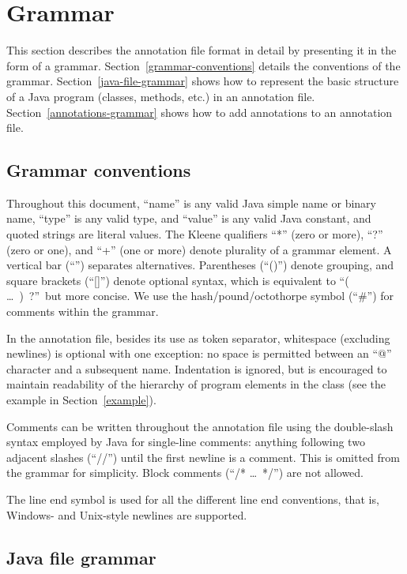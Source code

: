 \documentclass{article}
\begin{document}
\section{Grammar\label{grammar}}

This section describes the annotation file format in detail by presenting it in
the form of a grammar. Section~\ref{grammar-conventions} details the conventions
of the grammar. Section~\ref{java-file-grammar} shows how to represent the
basic structure of a Java program (classes, methods, etc.) in an annotation
file. Section~\ref{annotations-grammar} shows how to add annotations to an
annotation file.

\subsection{Grammar conventions\label{grammar-conventions}}

Throughout this document, ``name'' is any valid Java simple name or
binary name, ``type'' is any valid type, and ``value'' is any
valid Java constant, and quoted strings are literal values.
%
The Kleene qualifiers ``*'' (zero or more), ``?'' (zero or one), and ``+''
(one or more) denote plurality of a grammar element.
%
A vertical bar (``\bnfor'') separates alternatives.
Parentheses (``()'') denote grouping, and square brackets (``[]'')
denote optional syntax, which is equivalent to ``( \ldots\ )\ ?''\ but more concise.
We use the hash/pound/octothorpe symbol (``\#'') for comments within the grammar.

In the annotation file,
besides its use as token separator,
whitespace (excluding
newlines) is optional with one exception: no space is permitted
between an ``@'' character and a subsequent name. Indentation is
ignored, but is encouraged to maintain readability of the hierarchy of
program elements in the class (see the example in Section~\ref{example}).

Comments can be written throughout the annotation file using the double-slash
syntax employed by Java for single-line comments: anything following
two adjacent slashes (``//'') until the first newline is a comment.
This is omitted from the grammar for simplicity.
Block comments (``/* \ldots\ */'') are not allowed.

The line end symbol \lineend{} is used for all the different line end
conventions, that is, Windows- and Unix-style newlines are supported.


\subsection{Java file grammar\label{java-file-grammar}}
\end{document}

